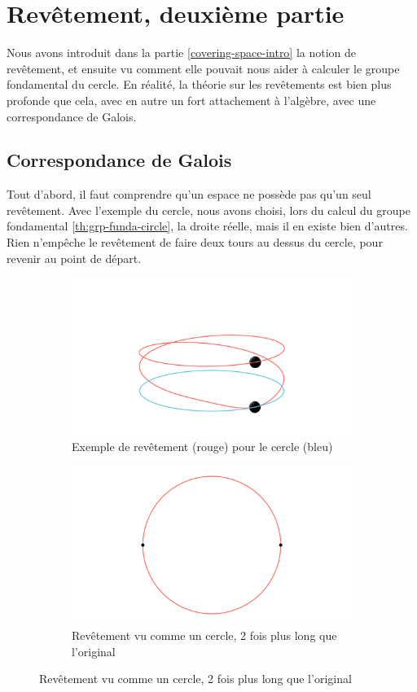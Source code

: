 
\section{Revêtement, deuxième partie}

Nous avons introduit dans la partie \ref{covering-space-intro} la notion de revêtement, et ensuite vu comment elle pouvait nous aider à calculer le groupe fondamental du cercle. En réalité, la théorie sur les revêtements est bien plus profonde que cela, avec en autre un fort attachement à l'algèbre, avec une correspondance de Galois.

\subsection{Correspondance de Galois}

Tout d'abord, il faut comprendre qu'un espace ne possède pas qu'un seul revêtement. Avec l'exemple du cercle, nous avons choisi, lors du calcul du groupe fondamental \ref{th:grp-funda-circle}, la droite réelle, mais il en existe bien d'autres. Rien n'empêche le revêtement de faire deux tours au dessus du cercle, pour revenir au point de départ.
\begin{figure}[H]
\centering
\begin{subfigure}[b]{0.45\linewidth}
\centering
    \includegraphics[width=.8\linewidth]{pictures/CoverCircle2_ManimCE_v0.18.1.png}
    \caption{\centering Exemple de revêtement (rouge) pour le cercle (bleu)}
    \label{fig:cover-circle-2}
\end{subfigure}
\hspace{5pt}
\begin{subfigure}[b]{0.45\linewidth}
\centering
    \includegraphics[width=.8\linewidth]{pictures/CoverCircle2_3_ManimCE_v0.18.1.png}
    \caption{\centering Revêtement vu comme un cercle, 2 fois plus long que l'original}
    \label{fig:cover-circle-2-2}
\end{subfigure}
\end{figure}

